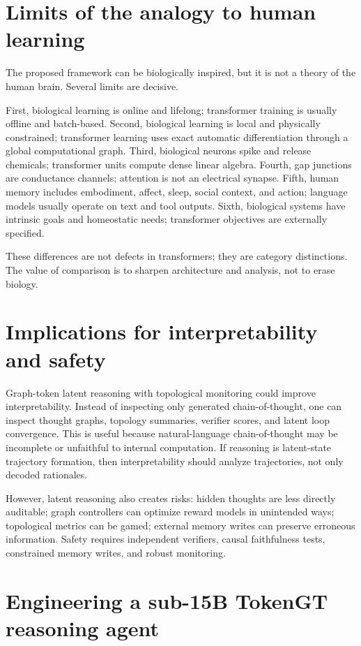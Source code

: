 \documentclass[11pt]{article}
\newcommand{\1}{\mathbf{1}}
\begin{document}
\section{Limits of the analogy to human learning}

The proposed framework can be biologically inspired, but it is not a theory of the human brain. Several limits are decisive.

First, biological learning is online and lifelong; transformer training is usually offline and batch-based. Second, biological learning is local and physically constrained; transformer learning uses exact automatic differentiation through a global computational graph. Third, biological neurons spike and release chemicals; transformer units compute dense linear algebra. Fourth, gap junctions are conductance channels; attention is not an electrical synapse. Fifth, human memory includes embodiment, affect, sleep, social context, and action; language models usually operate on text and tool outputs. Sixth, biological systems have intrinsic goals and homeostatic needs; transformer objectives are externally specified.

These differences are not defects in transformers; they are category distinctions. The value of comparison is to sharpen architecture and analysis, not to erase biology.

\section{Implications for interpretability and safety}

Graph-token latent reasoning with topological monitoring could improve interpretability. Instead of inspecting only generated chain-of-thought, one can inspect thought graphs, topology summaries, verifier scores, and latent loop convergence. This is useful because natural-language chain-of-thought may be incomplete or unfaithful to internal computation. If reasoning is latent-state trajectory formation, then interpretability should analyze trajectories, not only decoded rationales.

However, latent reasoning also creates risks: hidden thoughts are less directly auditable; graph controllers can optimize reward models in unintended ways; topological metrics can be gamed; external memory writes can preserve erroneous information. Safety requires independent verifiers, causal faithfulness tests, constrained memory writes, and robust monitoring.


\section{Engineering a sub-15B TokenGT reasoning agent}
\label{sec:engineering-agent}
\end{document}
